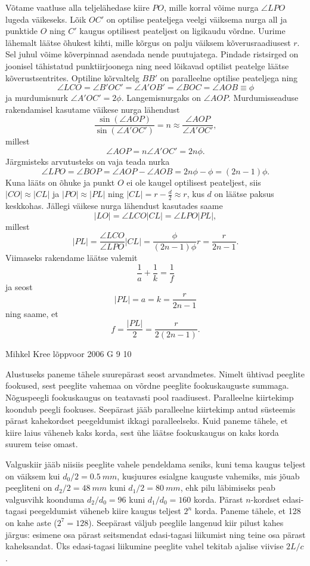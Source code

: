 \documentclass[11pt, twoside]{article}
\begin{document}
{{Võtame vaatluse alla teljelähedase kiire $PO$, mille korral võime nurga $\angle LPO$ lugeda väikeseks. Lõik $OC'$ on optilise peateljega veelgi väiksema nurga all ja punktide $O$ ning $C'$ kaugus optilisest peateljest on ligikaudu võrdne. Uurime lähemalt läätse õhukest kihti, mille kõrgus on palju väiksem kõverusraadiusest $r$. Sel juhul võime kõverpinnad asendada nende puutujatega. Pindade ristsirged on joonisel tähistatud punktiirjoonega ning need lõikavad optilist peatelge läätse kõverustsentrites. Optiline kõrvaltelg $BB'$ on paralleelne optilise peateljega ning 
\[
\angle LCO=\angle B'OC'=\angle A'OB'=\angle BOC=\angle AOB\equiv \phi
\]
ja murdumisnurk $\angle A'OC'=2\phi$. Langemisnurgaks on $\angle AOP$. Murdumisseaduse rakendamisel kasutame väikese nurga lähendust 
\[
\frac{\sin(\angle AOP)}{\sin(\angle A'OC')}=n\approx \frac{\angle AOP}{\angle A'OC'},
\]
millest
\[
\angle AOP = n \angle A'OC'=2n\phi.
\]
Järgmisteks arvutusteks on vaja teada nurka
\[
\angle LPO=\angle BOP=\angle AOP - \angle AOB=2n\phi-\phi=(2n-1)\phi.
\]
Kuna lääts on õhuke ja punkt $O$ ei ole kaugel optilisest peateljest, siis $|CO|\approx|CL|$ ja $|PO|\approx|PL|$ ning $|CL|=r-\frac{d}{2}\approx r$, kus $d$ on läätse paksus keskkohas. Jällegi väikese nurga lähendust kasutades saame
\[
|LO|=\angle LCO|CL|=\angle LPO|PL|,
\]
millest
\[
|PL|=\frac{\angle LCO}{\angle LPO}|CL|=\frac{\phi}{(2n-1)\phi} r=\frac{r}{2n-1}.
\]
Viimaseks rakendame läätse valemit
\[
\frac{1}{a}+\frac{1}{k}=\frac{1}{f}
\]
ja seost
\[
|PL|=a=k=\frac{r}{2n-1}
\]
ning saame, et
\[
f=\frac{|PL|}{2}=\frac{r}{2(2n-1)}.
\]
\fi
}

{Mihkel Kree} %
{lõppvoor} %
{2006} %
{G 9} %
{10} %
{

\ifSolution
Alustuseks paneme tähele suurepärast seost arvandmetes. Nimelt ühtivad peeglite fookused, sest peeglite vahemaa on võrdne peeglite fookuskauguste summaga. Nõguspeegli fookuskaugus on teatavasti pool raadiusest. Paralleelne kiirtekimp koondub peegli fookuses. Seepärast jääb paralleelne kiirtekimp antud süsteemis pärast kahekordset peegeldumist ikkagi paralleelseks. Kuid paneme tähele, et kiire laius väheneb kaks korda, sest ühe läätse fookuskaugus on kaks korda suurem teise omast.

Valguskiir jääb niisiis peeglite vahele pendeldama seniks, kuni tema kaugus teljest on väiksem kui $d_0/2 = \SI{0.5}{mm}$, kusjuures esialgne kauguste vahemiks, mis jõuab peegliteni on $d_2/2 = \SI{48}{mm}$ kuni $d_1/2 = \SI{80}{mm}$, ehk pilu läbimiseks peab valgusvihk koonduma $d_2/d_0 = 96$ kuni $d_1/d_0 = 160$ korda. Pärast $n$-kordset edasi-tagasi peegeldumist väheneb kiire kaugus teljest $2^n$ korda. Paneme tähele, et 128 on kahe aste ($2^7 = 128$). Seepärast väljub peeglile langenud kiir pilust kahes järgus: esimene osa pärast seitsmendat edasi-tagasi liikumist ning teine osa pärast kaheksandat. Üks edasi-tagasi liikumine peeglite vahel tekitab ajalise viivise $2L/c$.

}}
\end{document}
